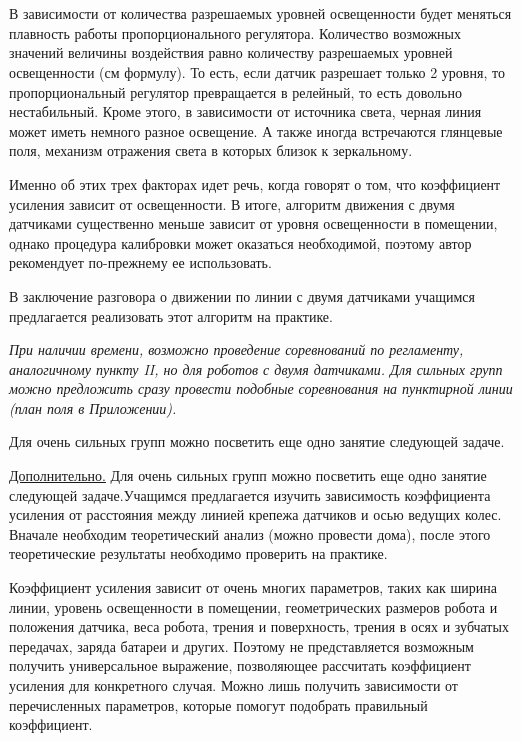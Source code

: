 \\\\

В зависимости от количества разрешаемых уровней освещенности будет меняться плавность работы пропорционального регулятора. Количество возможных значений величины воздействия равно количеству разрешаемых уровней освещенности (см формулу). То есть, если датчик разрешает только 2 уровня, то пропорциональный регулятор превращается в релейный, то есть довольно нестабильный. Кроме этого, в зависимости от источника света, черная линия может иметь немного разное освещение. А также иногда встречаются глянцевые поля, механизм отражения света в которых близок к зеркальному.

Именно об этих трех факторах идет речь, когда говорят о том, что коэффициент усиления зависит от освещенности. В итоге, алгоритм движения с двумя датчиками существенно меньше зависит от уровня освещенности в помещении, однако процедура калибровки может оказаться необходимой, поэтому автор рекомендует по-прежнему ее использовать.

В заключение разговора о движении по линии с двумя датчиками учащимся предлагается реализовать этот алгоритм на практике.

{\slshape При наличии времени, возможно проведение соревнований по регламенту, аналогичному пункту II, но для роботов с двумя датчиками.
Для сильных групп можно предложить сразу провести подобные соревнования на пунктирной линии (план поля в Приложении).

Для очень сильных групп можно посветить еще одно занятие следующей задаче.

\underline{Дополнительно.} Для очень сильных групп можно посветить еще одно занятие следующей задаче.Учащимся предлагается изучить зависимость коэффициента усиления от расстояния между линией крепежа датчиков и осью ведущих колес. Вначале необходим теоретический анализ (можно провести дома), после этого теоретические результаты необходимо проверить на практике.}

\textcolor[rgb]{1,0,0}{Коэффициент усиления зависит от очень многих параметров, таких как ширина линии, уровень освещенности в помещении, геометрических размеров робота и положения датчика, веса робота, трения и поверхность, трения в осях и зубчатых передачах, заряда батареи и других. Поэтому не представляется возможным получить универсальное выражение, позволяющее рассчитать коэффициент усиления для конкретного случая. Можно лишь получить зависимости от перечисленных параметров, которые помогут подобрать правильный коэффициент.}